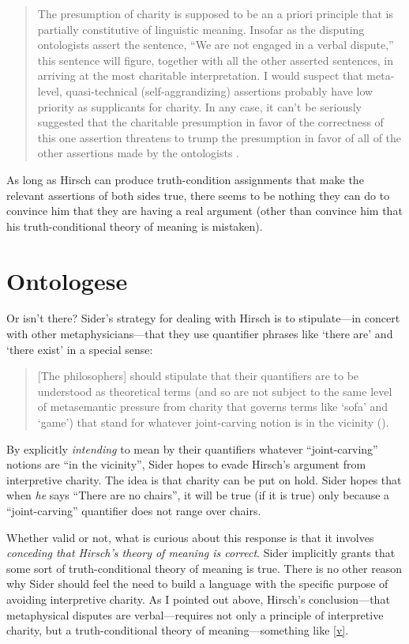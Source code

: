 \documentclass[12pt,twoside]{reedfancy}
\begin{document}
\begin{spacing}{1.25}
\begin{quote}
The presumption of charity is supposed to be an a priori principle
that is partially constitutive of linguistic meaning.  Insofar as the
disputing ontologists assert the sentence, ``We are not engaged in a
verbal dispute,'' this sentence will figure, together with all the
other asserted sentences, in arriving at the most charitable
interpretation.  I would suspect that meta-level, quasi-technical
(self-aggrandizing) assertions probably have low priority as
supplicants for charity.  In any case, it can't be seriously suggested
that the charitable presumption in favor of the correctness of this
one assertion threatens to trump the presumption in favor of all of
the other assertions made by the ontologists
\citeyearpar[515]{hirsch2008}.
\end{quote}

As long as Hirsch can produce truth-condition assignments that make
the relevant assertions of both sides true, there seems to be nothing
they can do to convince him that they are having a real argument
(other than convince him that his truth-conditional theory of meaning
is mistaken).

\section{Ontologese}
\label{ontologese}
Or isn't there?  Sider's strategy for dealing with Hirsch is to
stipulate---in concert with other metaphysicians---that they use
quantifier phrases like `there are' and `there exist' in a special
sense:

\begin{quote}
{[}The philosophers{]} should stipulate that their quantifiers are to be
understood as theoretical terms (and so are not subject to the same
level of metasemantic pressure from charity that governs terms like
`sofa' and `game') that stand for whatever joint-carving notion is in
the vicinity (\citeyear[9]{sider2011b}).
\end{quote}

By explicitly \emph{intending} to mean by their quantifiers whatever
``joint-carving'' notions are ``in the vicinity'', Sider hopes to
evade Hirsch's argument from interpretive charity.  The idea is that
charity can be put on hold.  Sider hopes that when {\em he} says
``There are no chairs'', it will be true (if it is true) only because
a ``joint-carving'' quantifier does not range over chairs.

Whether valid or not, what is curious about this response is that it
involves {\em conceding that Hirsch's theory of meaning is correct}.
Sider implicitly grants that some sort of truth-conditional theory of
meaning is true.  There is no other reason why Sider should feel the
need to build a language with the specific purpose of avoiding
interpretive charity.  As I pointed out above, Hirsch's
conclusion---that metaphysical disputes are verbal---requires not only
a principle of interpretive charity, but a truth-conditional theory of
meaning---something like \ref{v}.


\end{spacing}
\end{document}
